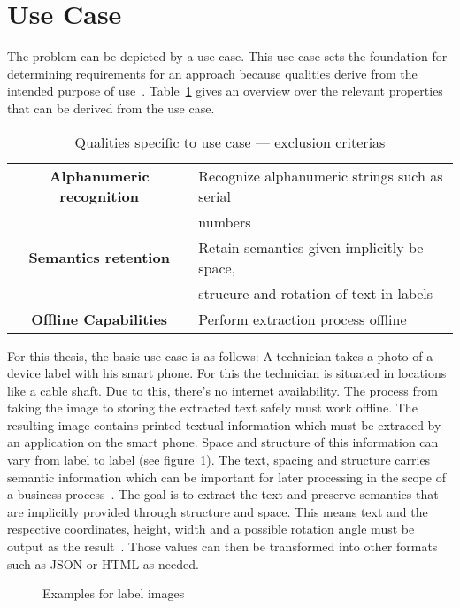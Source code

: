 \section{Use Case}
The problem can be depicted by a use case.
This use case sets the foundation for determining requirements for an
approach because qualities derive from the intended purpose of
use~\citep{siebert_construction_2021}.
Table~\ref{tb:useCaseQualities} gives an overview over the relevant properties that can be derived
from the use case.
\begin{table}[h]\label{tb:useCaseQualities}
    \centering
    \begin{tabular}{c l}
        \textbf{Alphanumeric recognition}    & Recognize alphanumeric strings such as serial \\
                                    & numbers \\
        \textbf{Semantics retention} & Retain semantics given implicitly be space, \\
                            & strucure and rotation of text in labels \\
        \textbf{Offline Capabilities} & Perform extraction process offline \\
    \end{tabular}
    \caption{Qualities specific to use case --- exclusion criterias}
\end{table}
For this thesis, the basic use case is as follows:
A technician takes a photo of a device label with his smart phone.
For this the technician is situated in locations like a cable shaft.
Due to this, there's no internet availability.
The process from taking the image to storing the extracted text safely must work offline.
The resulting image contains printed textual information which must be extraced by an application on
the smart phone.
Space and structure of this information can vary from label to label (see figure~\ref{fig:examples}).
The text, spacing and structure carries semantic information which can be important for later
processing in the scope of a business process~\citep{chen_text_2021}.
The goal is to extract the text and preserve semantics that are implicitly provided through
structure and space.
This means text and the respective coordinates, height, width and a possible rotation angle must
be output as the result~\citep{yang_learning_2021}.
Those values can then be transformed into other formats such as JSON or HTML as needed.
\begin{figure}[h]
    \centering
    \caption{Examples for label images\label{fig:examples}}
\end{figure}
